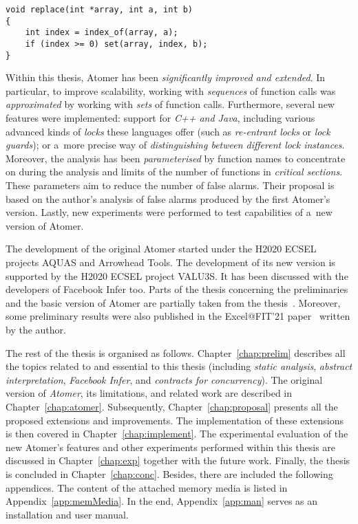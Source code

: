\begin{lstlisting}[style=c, label={list:exampleViolation}, float=hbt, caption={An example of an \emph{atomicity violation}}]
void replace(int *array, int a, int b)
{
    int index = index_of(array, a);
    if (index >= 0) set(array, index, b);
}
\end{lstlisting}

Within this thesis, Atomer has been \emph{significantly improved and extended}. In particular, to improve scalability, working with \emph{sequences} of function calls was \emph{approximated} by working with \emph{sets} of function calls. Furthermore, several new features were implemented: support for \emph{C++ and Java}, including various advanced kinds of \emph{locks} these languages offer (such as \emph{re-entrant locks} or \emph{lock guards}); or a~more precise way of \emph{distinguishing between different lock instances}. Moreover, the analysis has been \emph{parameterised} by function names to concentrate on during the analysis and limits of the number of functions in \emph{critical sections}. These parameters aim to reduce the number of false alarms. Their proposal is based on the author's analysis of false alarms produced by the first Atomer's version. Lastly, new experiments were performed to test capabilities of a~new version of Atomer.

The development of the original Atomer started under the H2020 ECSEL projects AQUAS and Arrowhead Tools. The development of its new version is supported by the H2020 ECSEL project VALU3S. It has been discussed with the developers of Facebook Infer too. Parts of the thesis concerning the preliminaries and the basic version of Atomer are partially taken from the thesis~\cite{harmimBP}. Moreover, some preliminary results were also published in the Excel@FIT'21 paper~\cite{excel2021Harmim} written by the author.

The rest of the thesis is organised as follows. Chapter~\ref{chap:prelim} describes all the topics related to and essential to this thesis (including \emph{static analysis}, \emph{abstract interpretation}, \emph{Facebook Infer}, and \emph{contracts for concurrency}). The original version of \emph{Atomer}, its limitations, and related work are described in Chapter~\ref{chap:atomer}. Subsequently, Chapter~\ref{chap:proposal} presents all the proposed extensions and improvements. The implementation of these extensions is then covered in Chapter~\ref{chap:implement}. The experimental evaluation of the new Atomer's features and other experiments performed within this thesis are discussed in Chapter~\ref{chap:exp} together with the future work. Finally, the thesis is concluded in Chapter~\ref{chap:conc}. Besides, there are included the following appendices. The content of the attached memory media is listed in Appendix~\ref{app:memMedia}. In the end, Appendix~\ref{app:man} serves as an installation and user manual.



